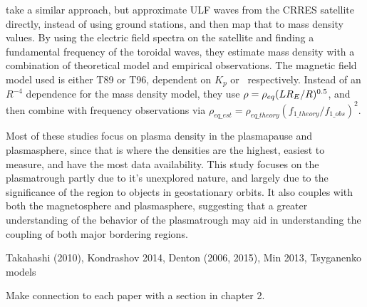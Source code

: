 \cite{Takahashi2006MassDensityInferred} take a similar approach, but approximate ULF waves from the CRRES satellite directly, instead of using ground stations, and then map that to mass density values. By using the electric field spectra on the satellite and finding a fundamental frequency of the toroidal waves, they estimate mass density with a combination of theoretical model and empirical observations. The magnetic field model used is either T89 or T96, dependent on $K_p$ or \dst\  respectively. Instead of an $R^{-4}$ dependence for the mass density model, they use $\rho=\rho_{eq}(LR_E/R)^{0.5}$, and then combine with frequency observations via $\rho_{eq\_est}=\rho_{eq\_theory}(f_{1\_theory}/f_{1\_obs})^2$.

Most of these studies focus on plasma density in the plasmapause and plasmasphere, since that is where the densities are the highest, easiest to measure, and have the most data availability. This study focuses on the plasmatrough partly due to it's unexplored nature, and largely due to the significance of the region to objects in geostationary orbits. It also couples with both the magnetosphere and plasmasphere, suggesting that a greater understanding of the behavior of the plasmatrough may aid in understanding the coupling of both major bordering regions.


\vnote Takahashi (2010), Kondrashov 2014, Denton (2006, 2015), Min 2013, Tsyganenko models

\note Make connection to each paper with a section in chapter 2.


